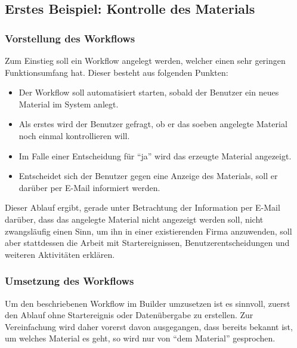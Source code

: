 \subsection{Erstes Beispiel: Kontrolle des Materials}
\label{sec:builder-1-bsp}

\subsubsection{Vorstellung des Workflows}
\label{sec:builder-1-bsp-vorstellung}
Zum Einstieg soll ein Workflow angelegt werden, welcher einen sehr geringen Funktionsumfang hat. Dieser besteht aus folgenden Punkten:

\begin{itemize}
	\item Der Workflow soll automatisiert starten, sobald der Benutzer ein neues Material im System anlegt.
	\item Als erstes wird der Benutzer gefragt, ob er das soeben angelegte Material noch einmal kontrollieren will.
	\item Im Falle einer Entscheidung für "`ja"' wird das erzeugte Material angezeigt.
	\item Entscheidet sich der Benutzer gegen eine Anzeige des Materials, soll er darüber per E-Mail informiert werden.
\end{itemize}

Dieser Ablauf ergibt, gerade unter Betrachtung der Information per E-Mail darüber, dass das angelegte Material nicht angezeigt werden soll, nicht zwangsläufig einen Sinn, um ihn in einer existierenden Firma anzuwenden, soll aber stattdessen die Arbeit mit Startereignissen, Benutzerentscheidungen und weiteren Aktivitäten erklären.

\subsubsection{Umsetzung des Workflows}
\label{sec:builder-1-bsp-umsetzung}
Um den beschriebenen Workflow im Builder umzusetzen ist es sinnvoll, zuerst den Ablauf ohne Startereignis oder Datenübergabe zu erstellen. Zur Vereinfachung wird daher vorerst davon ausgegangen, dass bereits bekannt ist, um welches Material es geht, so wird nur von "`dem Material"' gesprochen. 

